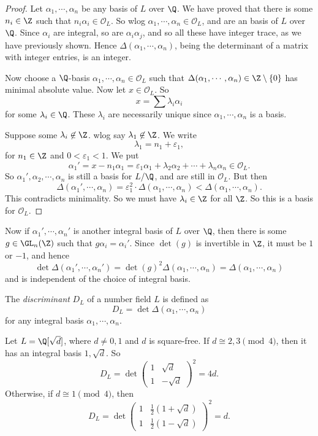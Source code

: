 \documentclass[a4paper]{article}
\begin{document}
\begin{proof}
  Let $\alpha_1, \cdots, \alpha_n$ be any basis of $L$ over $\Q$. We have proved that there is some $n_i \in \Z$ such that $n_i \alpha_i \in \mathcal{O}_L$. So wlog $\alpha_1, \cdots, \alpha_n \in \mathcal{O}_L$, and are an basis of $L$ over $\Q$. Since $\alpha_i$ are integral, so are $\alpha_i \alpha_j$, and so all these have integer trace, as we have previously shown. Hence $\Delta(\alpha_1, \cdots, \alpha_n)$, being the determinant of a matrix with integer entries, is an integer.

  Now choose a $\Q$-basis $\alpha_1, \cdots, \alpha_n \in \mathcal{O}_L$ such that $\Delta(\alpha_1, \cdots, \alpha_n) \in \Z\setminus \{0\}$ has minimal absolute value. Now let $x \in \mathcal{O}_L$. So
  \[
    x = \sum \lambda_i \alpha_i
  \]
  for some $\lambda_i \in \Q$. These $\lambda_i$ are necessarily unique since $\alpha_1, \cdots, \alpha_n$ is a basis.

  Suppose some $\lambda_i \not\in \Z$. wlog say $\lambda_1 \not \in \Z$. We write
  \[
    \lambda_1 = n_1 + \varepsilon_1,
  \]
  for $n_1 \in \Z$ and $0 < \varepsilon_1 < 1$. We put
  \[
    \alpha_1' = x - n_1 \alpha_1 = \varepsilon_1 \alpha_1 + \lambda_2 \alpha_2 + \cdots + \lambda_n \alpha_n \in \mathcal{O}_L.
  \]
  So $\alpha_1', \alpha_2, \cdots, \alpha_n$ is still a basis for $L/\Q$, and are still in $\mathcal{O}_L$. But then
  \[
    \Delta(\alpha_1', \cdots, \alpha_n) = \varepsilon_1^2 \cdot \Delta(\alpha_1, \cdots, \alpha_n) < \Delta(\alpha_1, \cdots, \alpha_n).
  \]
  This contradicts minimality. So we must have $\lambda_i \in \Z$ for all $\Z$. So this is a basis for $\mathcal{O}_L$.
\end{proof}

Now if $\alpha_1', \cdots, \alpha_n'$ is another integral basis of $L$ over $\Q$, then there is some $g \in \GL_n(\Z)$ such that $g\alpha_i = \alpha_i'$. Since $\det (g)$ is invertible in $\Z$, it must be $1$ or $-1$, and hence
\[
  \det \Delta(\alpha_1', \cdots, \alpha_n') = \det(g)^2 \Delta (\alpha_1, \cdots, \alpha_n) = \Delta(\alpha_1, \cdots, \alpha_n)
\]
and is independent of the choice of integral basis.
\begin{defi}[Discriminant]
  The \emph{discriminant} $D_L$ of a number field $L$ is defined as
  \[
    D_L = \det \Delta(\alpha_1, \cdots, \alpha_n)
  \]
  for any integral basis $\alpha_1, \cdots, \alpha_n$.
\end{defi}

\begin{eg}
  Let $L = \Q[\sqrt{d}]$, where $d \not= 0, 1$ and $d$ is square-free. If $d \cong 2, 3 \pmod 4$, then it has an integral basis $1, \sqrt{d}$. So
  \[
    D_L = \det
    \begin{pmatrix}
      1 & \sqrt{d}\\
      1 & -\sqrt{d}
    \end{pmatrix}^2 = 4d.
  \]
  Otherwise, if $d \cong 1 \pmod 4$, then
  \[
    D_L = \det
    \begin{pmatrix}
      1 & \frac{1}{2}(1 + \sqrt{d})\\
      1 & \frac{1}{2}(1 - \sqrt{d})
    \end{pmatrix}^2 = d.
  \]
\end{eg}
\end{document}
